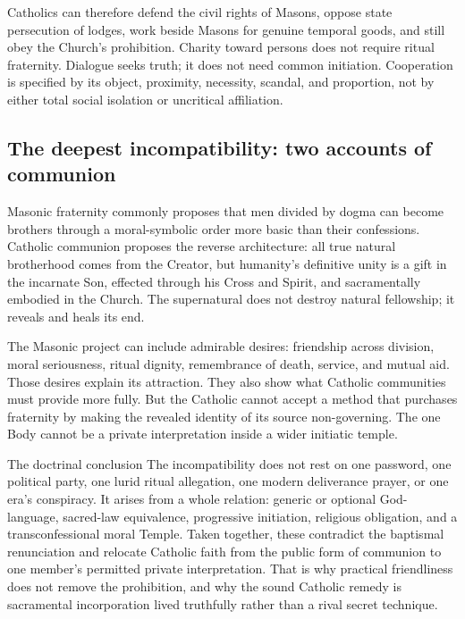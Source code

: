 Catholics can therefore defend the civil rights of Masons, oppose state persecution of lodges, work beside Masons for genuine temporal goods, and still obey the Church's prohibition. Charity toward persons does not require ritual fraternity. Dialogue seeks truth; it does not need common initiation. Cooperation is specified by its object, proximity, necessity, scandal, and proportion, not by either total social isolation or uncritical affiliation.

\subsection{The deepest incompatibility: two accounts of communion}

Masonic fraternity commonly proposes that men divided by dogma can become brothers through a moral-symbolic order more basic than their confessions. Catholic communion proposes the reverse architecture: all true natural brotherhood comes from the Creator, but humanity's definitive unity is a gift in the incarnate Son, effected through his Cross and Spirit, and sacramentally embodied in the Church. The supernatural does not destroy natural fellowship; it reveals and heals its end.

The Masonic project can include admirable desires: friendship across division, moral seriousness, ritual dignity, remembrance of death, service, and mutual aid. Those desires explain its attraction. They also show what Catholic communities must provide more fully. But the Catholic cannot accept a method that purchases fraternity by making the revealed identity of its source non-governing. The one Body cannot be a private interpretation inside a wider initiatic temple.

\begin{massbox}{The doctrinal conclusion}
The incompatibility does not rest on one password, one political party, one lurid ritual allegation, one modern deliverance prayer, or one era's conspiracy. It arises from a whole relation: generic or optional God-language, sacred-law equivalence, progressive initiation, religious obligation, and a transconfessional moral Temple. Taken together, these contradict the baptismal renunciation and relocate Catholic faith from the public form of communion to one member's permitted private interpretation. That is why practical friendliness does not remove the prohibition, and why the sound Catholic remedy is sacramental incorporation lived truthfully rather than a rival secret technique.
\end{massbox}
